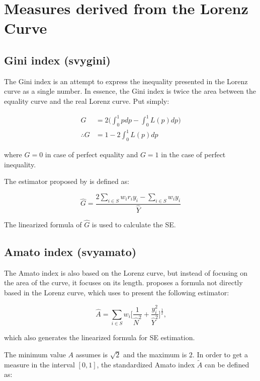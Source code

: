 \documentclass[]{book}
\begin{document}
\section{Measures derived from the Lorenz
Curve}\label{measures-derived-from-the-lorenz-curve}

\subsection{Gini index (svygini)}\label{gini-index-svygini}

The Gini index is an attempt to express the inequality presented in the
Lorenz curve as a single number. In essence, the Gini index is twice the
area between the equality curve and the real Lorenz curve. Put simply:

\[
\begin{aligned}
G &= 2 \bigg( \int_{0}^{1} pdp - \int_{0}^{1} L(p)dp \bigg) \\
\therefore G &= 1 - 2 \int_{0}^{1} L(p)dp
\end{aligned}
\]

where \(G=0\) in case of perfect equality and \(G = 1\) in the case of
perfect inequality.

The estimator proposed by \citep{osier2009} is defined as:

\[
\widehat{G} = \frac{ 2 \sum_{i \in S} w_i r_i y_i - \sum_{i \in S} w_i y_i }{ \hat{Y} }
\]

The linearized formula of \(\widehat{G}\) is used to calculate the SE.

\subsection{Amato index (svyamato)}\label{amato-index-svyamato}

The Amato index is also based on the Lorenz curve, but instead of
focusing on the area of the curve, it focuses on its length.
\citep{arnold2012} proposes a formula not directly based in the Lorenz
curve, which \citep{barabesi2016} uses to present the following
estimator:

\[
\widehat{A} = \sum_{i \in S} w_i \bigg[ \frac{1}{\widehat{N}^2} + \frac{y_i^2}{\widehat{Y}^2} \bigg]^{\frac{1}{2}} \text{,}
\]

which also generates the linearized formula for SE estimation.

The minimum value \(A\) assumes is \(\sqrt{2}\) and the maximum is
\(2\). In order to get a measure in the interval \([0,1]\), the
standardized Amato index \(\widetilde{A}\) can be defined as:
\end{document}
